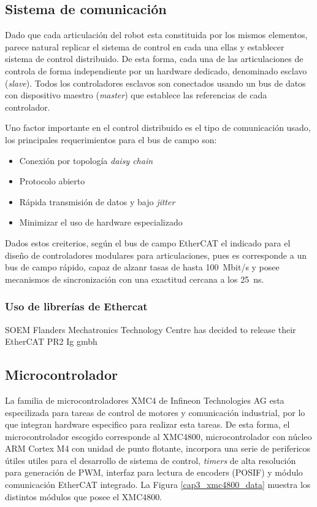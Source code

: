 \subsection{Sistema de comunicación}

Dado que cada articulación del robot esta constituida por los mismos elementos, parece natural replicar el sistema de control en cada una ellas y establecer sistema de control distribuido. De esta forma, cada una de las articulaciones de controla de forma independiente por un hardware dedicado, denominado esclavo (\textit{slave}). Todos los controladores esclavos son conectados usando un bus de datos con dispositivo maestro (\textit{master}) que establece las referencias de cada controlador.

Uno factor importante en el control distribuido es el tipo de comunicación usado, los principales requerimientos para el bus de campo son:
\begin{itemize}
\item Conexión por topología \textit{daisy chain}
\item Protocolo abierto
\item Rápida transmisión de datos y bajo \textit{jitter} 
\item Minimizar el uso de hardware especializado
\end{itemize}

Dados estos creiterios, según \cite{liu2015} el bus de campo EtherCAT el indicado para el diseño de controladores modulares para articulaciones, pues es corresponde a un bus de campo rápido, capaz de alzanr tasas de hasta \SI{100}{Mbit/s} y posee mecanismos de sincronización con una exactitud cercana a los \SI{25}{\nano\second}.

\subsubsection{Uso de librerías de Ethercat}

SOEM
Flanders Mechatronics Technology Centre has decided to release their EtherCAT PR2
Ig gmbh

\subsection{Microcontrolador}

La familia de microcontroladores XMC4 de Infineon Technologies AG esta especilizada para tareas de control de motores y comunicación industrial, por lo que integran hardware especifico para realizar esta tareas. De esta forma, el microcontrolador escogido corresponde al XMC4800, microcontrolador con núcleo ARM Cortex M4 con unidad de punto flotante, incorpora una serie de perifericos útiles utiles para el desarrollo de sistema de control, \textit{timers} de alta resolución para generación de PWM, interfaz para lectura de encoders (POSIF) y módulo comunicación EtherCAT integrado. La Figura \ref{cap3_xmc4800_data} muestra los distintos módulos que posee el XMC4800.

